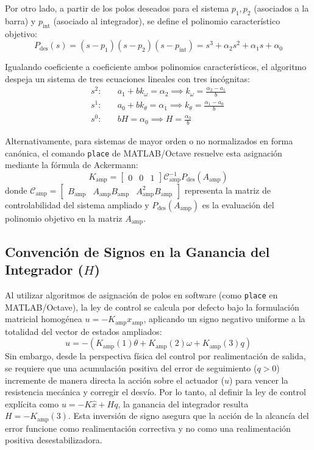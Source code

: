 \documentclass[a4paper, twoside, 10pt, spanish]{article}
\numberwithin{table}{section}
\begin{document}
Por otro lado, a partir de los polos deseados para el sistema $p_1, p_2$ (asociados a la barra) y $p_{\text{int}}$ (asociado al integrador), se define el polinomio característico objetivo:
\begin{equation}
P_{\text{des}}(s) = (s - p_1)(s - p_2)(s - p_{\text{int}}) = s^3 + \alpha_2 s^2 + \alpha_1 s + \alpha_0
\end{equation}

Igualando coeficiente a coeficiente ambos polinomios característicos, el algoritmo despeja un sistema de tres ecuaciones lineales con tres incógnitas:
\begin{align}
s^2: & \quad a_1 + b k_\omega = \alpha_2 \implies k_\omega = \frac{\alpha_2 - a_1}{b} \\[4pt]
s^1: & \quad a_0 + b k_\theta = \alpha_1 \implies k_\theta = \frac{\alpha_1 - a_0}{b} \\[4pt]
s^0: & \quad b H = \alpha_0 \implies H = \frac{\alpha_0}{b}
\end{align}

Alternativamente, para sistemas de mayor orden o no normalizados en forma canónica, el comando \texttt{place} de MATLAB/Octave resuelve esta asignación mediante la fórmula de Ackermann:
\begin{equation}
K_{\text{amp}} = \begin{bmatrix} 0 & 0 & 1 \end{bmatrix} \mathcal{C}_{\text{amp}}^{-1} P_{\text{des}}(A_{\text{amp}})
\end{equation}
donde $\mathcal{C}_{\text{amp}} = \begin{bmatrix} B_{\text{amp}} & A_{\text{amp}}B_{\text{amp}} & A_{\text{amp}}^2 B_{\text{amp}} \end{bmatrix}$ representa la matriz de controlabilidad del sistema ampliado y $P_{\text{des}}(A_{\text{amp}})$ es la evaluación del polinomio objetivo en la matriz $A_{\text{amp}}$.

\subsection{Convención de Signos en la Ganancia del Integrador ($H$)}
Al utilizar algoritmos de asignación de polos en software (como \texttt{place} en MATLAB/Octave), la ley de control se calcula por defecto bajo la formulación matricial homogénea $u = -K_{\text{amp}} x_{\text{amp}}$, aplicando un signo negativo uniforme a la totalidad del vector de estados ampliados:
\begin{equation}
u = -\left( K_{\text{amp}}(1)\theta + K_{\text{amp}}(2)\omega + K_{\text{amp}}(3)q \right)
\end{equation}
Sin embargo, desde la perspectiva física del control por realimentación de salida, se requiere que una acumulación positiva del error de seguimiento ($q > 0$) incremente de manera directa la acción sobre el actuador ($u$) para vencer la resistencia mecánica y corregir el desvío. Por lo tanto, al definir la ley de control explícita como $u = -K \hat{x} + H q$, la ganancia del integrador resulta $H = -K_{\text{amp}}(3)$. Esta inversión de signo asegura que la acción de la alcancía del error funcione como realimentación correctiva y no como una realimentación positiva desestabilizadora.
\end{document}
